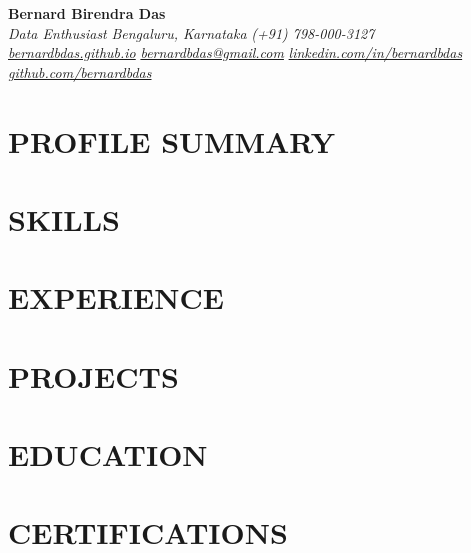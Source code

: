 \documentclass{main}
\begin{document}
\begin{flushleft}
  \textbf{\huge Bernard Birendra Das} \\
  \textit{Data Enthusiast}\pipe%
  \textit{Bengaluru, Karnataka}\pipe%
  \textit{(+91) 798-000-3127}\\
  \href{https://bernardbdas.github.io}{\textit{bernardbdas.github.io}}\pipe%
  \href{mailto:bernardbdas@gmail.com}{\textit{bernardbdas@gmail.com}}\pipe%
  \href{https://linkedin.com/in/bernardbdas}{\textit{linkedin.com/in/bernardbdas}}\pipe%
  \href{https://github.com/bernardbdas}{\textit{github.com/bernardbdas}}%
\end{flushleft}

\section{PROFILE SUMMARY}


\section{SKILLS}


\section{EXPERIENCE}


\section{PROJECTS}


\section{EDUCATION}


\section{CERTIFICATIONS}


% 
\end{document}
